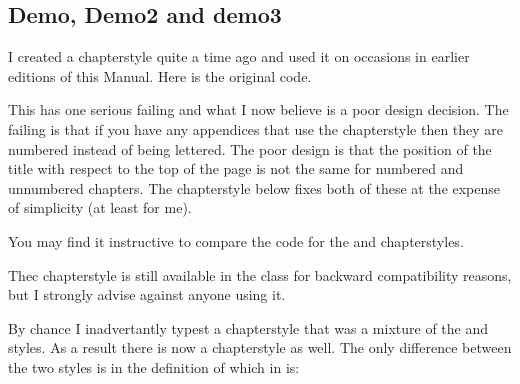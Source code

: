 \subsection{Demo, Demo2 and demo3}

    I created a  chapterstyle quite a time ago and used it 
on occasions in earlier editions of this Manual. Here is the original code.
\begin{lcode}
\end{lcode}

This has one serious failing and what I now believe is a poor design 
decision. The failing is that if you have any appendices that use the
 chapterstyle then they are numbered instead of being lettered.
The poor design is that the position of the title with respect to the top
of the page is not the same for numbered and unnumbered chapters.
    The  chapterstyle below fixes both of these at the expense
of simplicity (at least for me).
\begin{lcode}
\end{lcode}
    You may find it instructive to compare the code for the  and 
 chapterstyles.

    Thec  chapterstyle is still available in the class for
backward compatibility reasons, but I strongly advise against anyone using it.

    By chance I inadvertantly typest a chapterstyle that was a mixture
of the  and  styles. As a result there is
now a  chapterstyle as well. The only difference between the
two styles is in the definition of  which in 
is:
\begin{lcode}
\renewcommand*{\chapnumfont}{\normalfont\HUGE\itshape}
\end{lcode}

